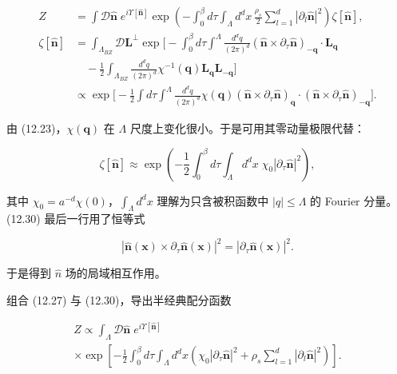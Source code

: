 \begin{align*}
Z & = \int \mathcal {D} \hat {\mathbf {n}} \; e ^ {i \Upsilon [ \hat {\mathbf {n}} ]} \exp \left( - \int_ {0} ^ {\beta} d \tau \int_{\Lambda} d ^ {d} x \, \frac {\rho_ {s}}{2} \sum_ {l = 1} ^ {d} \left| \partial_ {l} \hat {\mathbf {n}} \right| ^ {2} \right) \zeta [ \hat {\mathbf {n}} ] ,\\
\zeta [ \hat {\mathbf {n}} ] & = \int_{\Lambda_{BZ}} \mathcal {D} \mathbf {L} ^ {\perp} \exp \Big[ - \int_ {0} ^ {\beta} d \tau \int^ {\Lambda} \frac {d ^ {d} q}{( 2 \pi ) ^ {d}} \left( \hat {\mathbf {n}} \times \partial_ {\tau} \hat {\mathbf {n}} \right)_{- \mathbf {q}} \cdot \mathbf {L} _ {\mathbf {q}}\\
& \quad - \frac {1}{2} \int_{\Lambda_{BZ}} \frac {d ^ {d} q}{( 2 \pi ) ^ {d}} \chi^ {- 1} ( \mathbf {q} ) \mathbf {L} _ {\mathbf {q}} \mathbf {L} _ {- \mathbf {q}} \Big]\\
& \propto \exp \Big[ - \frac {1}{2} \int d \tau \int^ {\Lambda} \frac {d ^ {d} q}{( 2 \pi ) ^ {d}} \chi ( \mathbf {q} ) \left( \hat {\mathbf {n}} \times \partial_ {\tau} \hat {\mathbf {n}} \right)_{\mathbf {q}} \cdot \left( \hat {\mathbf {n}} \times \partial_ {\tau} \hat {\mathbf {n}} \right)_{- \mathbf {q}} \Big] .
\tag{12.29}
\end{align*}

由 (12.23)，$\chi(\mathbf{q})$ 在 $\Lambda$ 尺度上变化很小。于是可用其零动量极限代替：

\begin{equation*}
\zeta [ \hat {\mathbf {n}} ] \approx \exp \left( - \frac {1}{2} \int_ {0} ^ {\beta} d \tau \int_{\Lambda} d ^ {d} x \; \chi_ {0} \left| \partial_ {\tau} \hat {\mathbf {n}} \right| ^ {2} \right) ,
\tag{12.30}
\end{equation*}

其中 $\chi_{0}=a^{-d}\chi(0)$，$\int_{\Lambda}d^{d}x$ 理解为只含被积函数中 $|q|\leq\Lambda$ 的 Fourier 分量。(12.30) 最后一行用了恒等式

\begin{equation*}
\left| \hat {\mathbf {n}} ( \mathbf {x} ) \times \partial_ {\tau} \hat {\mathbf {n}} ( \mathbf {x} ) \right| ^ {2} = \left| \partial_ {\tau} \hat {\mathbf {n}} ( \mathbf {x} ) \right| ^ {2}.
\tag{12.31}
\end{equation*}

于是得到 $\hat{n}$ 场的局域相互作用。

组合 (12.27) 与 (12.30)，导出半经典配分函数

\begin{align*}
Z \propto \int_{\Lambda} \mathcal {D} \hat {\mathbf {n}} \; e ^ {i \Upsilon [ \hat {\mathbf {n}} ]}\\
\times \exp \left[ - \frac {1}{2} \int_ {0} ^ {\beta} d \tau \int_{\Lambda} d ^ {d} x \left( \chi_ {0} \left| \partial_ {\tau} \hat {\mathbf {n}} \right| ^ {2} + \rho_ {s} \sum_ {l = 1} ^ {d} \left| \partial_ {l} \hat {\mathbf {n}} \right| ^ {2} \right) \right] .
\tag{12.32}
\end{align*}

